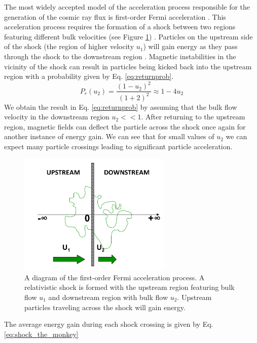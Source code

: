 \documentclass{gatech-thesis}
\begin{document}
The most widely accepted model of the acceleration process responsible for the generation of the cosmic ray flux is first-order Fermi acceleration \cite{1995PhR...258..173G}. This acceleration process requires the formation of a shock between two regions featuring different bulk velocities (see Figure \ref{fig:FA}) \cite{ParticleAcceleration}. Particles on the upstream side of the shock (the region of higher velocity $u_1$) will gain energy as they pass through the shock to the downstream region \cite{PhysRev.75.1169}. Magnetic instabilities in the vicinity of the shock can result in particles being kicked back into the upstream region with a probability given by Eq. \ref{eq:returnprob}.
\begin{equation}\label{eq:returnprob}
P_r(u_2) = \frac{(1-u_2)^2}{(1+2)^2} \approx 1-4u_2
\end{equation}
We obtain the result in Eq. \ref{eq:returnprob} by assuming that the bulk flow velocity in the downstream region $u_2 << 1$. After returning to the upstream region, magnetic fields can deflect the particle across the shock once again for another instance of energy gain. We can see that for small values of $u_2$ we can expect many particle crossings leading to significant particle acceleration.
\begin{figure}[ht]
  \begin{center}
    \includegraphics[width=0.65\textwidth,keepaspectratio]{FermiAcceleration.png}
  \end{center}
  \caption[Fermi-acceleration Diagram]{A diagram of the first-order Fermi acceleration process. A relativistic shock is formed with the upstream region featuring bulk flow $u_1$ and downstream region with bulk flow $u_2$. Upstream particles traveling  across the shock will gain energy\cite{ParticleAcceleration}.}
  \label{fig:FA}
\end{figure}
The average energy gain during each shock crossing is given by Eq. \ref{eq:shock_the_monkey}
\end{document}
